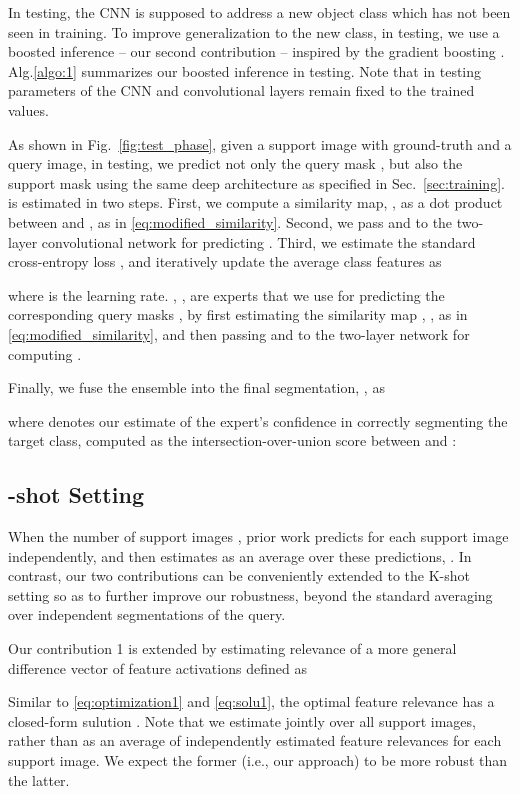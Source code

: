 \documentclass[10pt,twocolumn,letterpaper]{article}
\begin{document}
In testing, the CNN is supposed to address a new object class which has not been seen in training.
To improve generalization to the new class, in testing, we use a boosted inference -- our second contribution -- inspired by the gradient boosting \cite{friedman2001greedy}.  Alg.\ref{algo:1} summarizes our boosted inference in testing. Note that in testing parameters of the CNN and convolutional layers remain fixed to the trained values.


As shown in Fig.~\ref{fig:test_phase}, given a support image with ground-truth  and a query image, in testing, we predict not only the query mask , but also the support mask  using the same deep architecture as specified in Sec.~\ref{sec:training}.   is estimated in two steps. First, we compute a similarity map, , as a dot product between  and  , as in \eqref{eq:modified_similarity}. Second, we pass  and  to the two-layer convolutional network for predicting . Third, we estimate the standard cross-entropy loss , and iteratively update the average class features as

where  is the learning rate. , , are experts that we use for predicting the corresponding query masks  , 
by first estimating the similarity map , , as in \eqref{eq:modified_similarity}, and then passing  and  to the two-layer network for computing . 

Finally, we fuse the ensemble   into the final segmentation, , as

where  denotes our estimate of the expert's confidence in correctly segmenting the target class, computed  as the intersection-over-union score between  and :



\subsection{-shot Setting}\label{sec:k-shot}
When the number of support images , prior work \cite{rakelly2018conditional,rakelly2018fewshot,dong2018few,zhang2018sgone} predicts  for each support image independently,  and then estimates  as an average over these predictions, . In contrast, our two contributions can be conveniently extended to the K-shot setting so as to further improve our robustness, beyond the standard averaging over  independent segmentations of the query. 

Our contribution 1 is extended by estimating relevance  of a more general difference vector of feature activations defined as

Similar to \eqref{eq:optimization1} and \eqref{eq:solu1}, the optimal feature relevance has a closed-form sulution . Note that we  estimate  jointly over all  support images, rather than as an average of independently estimated feature relevances for each support image. We expect the former (i.e., our approach) to be more robust than the latter.
\end{document}

